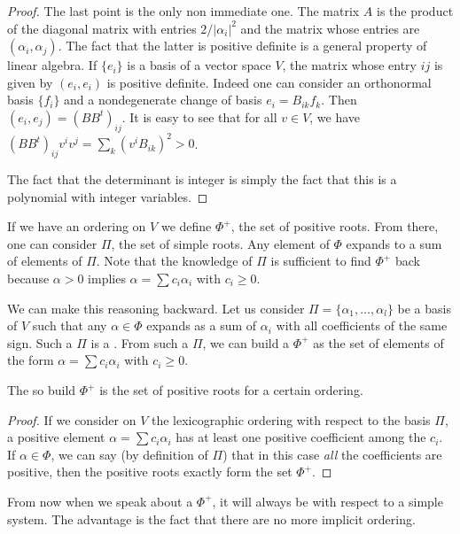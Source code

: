     \begin{proof}
    The last point is the only non immediate one. The matrix $A$ is the product of the diagonal matrix with entries $2/|\alpha_i|^2$ and the matrix whose entries are $(\alpha_i,\alpha_j)$. The fact that the latter is positive definite is a general property of linear algebra. If $\{e_i\}$ is a basis of a vector space $V$, the matrix whose entry $ij$ is given by $(e_i,e_i)$ is positive definite. Indeed one can consider an orthonormal basis $\{f_i\}$ and a nondegenerate change of basis $e_i=B_{ik}f_k$. Then $(e_i,e_j)=(BB^t)_{ij}$. It is easy to see that for all $v\in V$, we have $(BB^t)_{ij}v^iv^j=\sum_k(v^iB_{ik})^2>0$.

    The fact that the determinant is integer is simply the fact that this is a polynomial with integer variables.
\end{proof}

If we have an ordering on $V$ we define $\Phi^+$, the set of positive roots. From there, one can consider $\Pi$, the set of simple roots. Any element of $\Phi$ expands to a sum of elements of $\Pi$. Note that the knowledge of $\Pi$ is sufficient to find $\Phi^+$ back because $\alpha>0$ implies $\alpha=\sum c_i\alpha_i$ with $c_i\geq 0$.

We can make this reasoning backward. Let us consider $\Pi=\{\alpha_1,\ldots,\alpha_l\}$ be a basis of $V$ such that any $\alpha\in\Phi$ expands as a sum of $\alpha_i$ with all coefficients of the same sign. Such a $\Pi$ is a . From such a $\Pi$, we can build a $\Phi^+$ as the set of elements of the form $\alpha=\sum c_i\alpha_i$ with $c_i\geq 0$.

\begin{proposition}
The so build $\Phi^+$ is the set of positive roots for a certain ordering.
\end{proposition}

\begin{proof}
If we consider on $V$ the lexicographic ordering with respect to the basis $\Pi$, a positive element $\alpha=\sum c_i\alpha_i$ has at least one positive coefficient among the $c_i$. If $\alpha\in\Phi$, we can say (by definition of $\Pi$) that in this case \emph{all} the coefficients are positive, then the positive roots exactly form the set $\Phi^+$.
\end{proof}

From now when we speak about a $\Phi^+$, it will always be with respect to a simple system. The advantage is the fact that there are no more implicit ordering.

